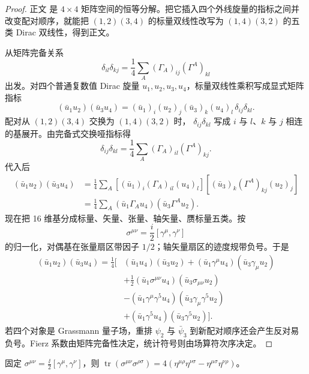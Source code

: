 \begin{proof}
正文 是 $4\times4$ 矩阵空间的恒等分解。把它插入四个外线旋量的指标之间并改变配对顺序，就能把 $(1,2)(3,4)$ 的标量双线性改写为 $(1,4)(3,2)$ 的五类 Dirac 双线性，得到正文。



从矩阵完备关系
\begin{equation*}
\delta_{il}\delta_{kj}
=\frac14\sum_A(\Gamma_A)_{ij}(\Gamma^A)_{kl}
\end{equation*}
出发。对四个普通复数值 Dirac 旋量 $u_1,u_2,u_3,u_4$，标量双线性乘积写成显式矩阵指标
\begin{equation*}
(\bar u_1u_2)(\bar u_3u_4)
=(\bar u_1)_i(u_2)_j(\bar u_3)_k(u_4)_l\,
\delta_{ij}\delta_{kl}.
\end{equation*}
配对从 $(1,2)(3,4)$ 交换为 $(1,4)(3,2)$ 时， $\delta_{ij}\delta_{kl}$ 写成 $i$ 与 $l$、$k$ 与 $j$ 相连的基展开。由完备式交换哑指标得
\begin{equation*}
\delta_{ij}\delta_{kl}
=\frac14\sum_A(\Gamma_A)_{il}(\Gamma^A)_{kj}.
\end{equation*}
代入后
\begin{align*}
(\bar u_1u_2)(\bar u_3u_4)
&=\frac14\sum_A
[(\bar u_1)_i(\Gamma_A)_{il}(u_4)_l]
[(\bar u_3)_k(\Gamma^A)_{kj}(u_2)_j]\\
&=\frac14\sum_A
(\bar u_1\Gamma_Au_4)(\bar u_3\Gamma^Au_2).
\end{align*}
现在把 16 维基分成标量、矢量、张量、轴矢量、赝标量五类。按
\begin{equation*}
\sigma^{\mu\nu}=\frac{i}{2}[\gamma^\mu,\gamma^\nu]
\end{equation*}
的归一化，对偶基在张量扇区带因子 $1/2$；轴矢量扇区的迹度规带负号。于是
\begin{align*}
(\bar u_1u_2)(\bar u_3u_4)
=\frac14\Big[&
(\bar u_1u_4)(\bar u_3u_2)
+(\bar u_1\gamma^\mu u_4)(\bar u_3\gamma_\mu u_2)\\
&+\frac12(\bar u_1\sigma^{\mu\nu}u_4)
(\bar u_3\sigma_{\mu\nu}u_2)\\
&-(\bar u_1\gamma^\mu\gamma^5u_4)
(\bar u_3\gamma_\mu\gamma^5u_2)\\
&+(\bar u_1\gamma^5u_4)(\bar u_3\gamma^5u_2)
\Big].
\end{align*}
若四个对象是 Grassmann 量子场，重排 $\psi_2$ 与 $\bar\psi_3$ 到新配对顺序还会产生反对易负号。Fierz 系数由矩阵完备性决定，统计符号则由场算符次序决定。
\end{proof}

\begin{lemma}
固定 $\sigma^{\mu\nu}=\frac{\ii}{2}[\gamma^\mu,\gamma^\nu]$，则 $\operatorname{tr}(\sigma^{\mu\nu}\sigma^{\rho\sigma})=4(\eta^{\mu\rho}\eta^{\nu\sigma}-\eta^{\mu\sigma}\eta^{\nu\rho})$。
\end{lemma}

